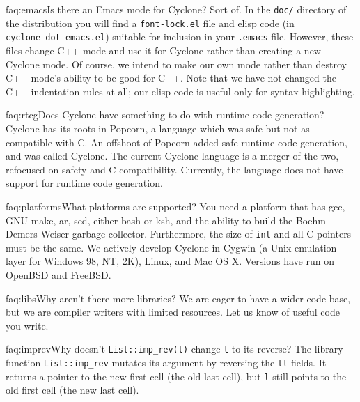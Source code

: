 \begin{faqa}{faq:emacs}{Is there an Emacs mode for Cyclone?}
Sort of.  In the \texttt{doc/} directory of the distribution you will
find a \texttt{font-lock.el} file and elisp code (in
\texttt{cyclone_dot_emacs.el}) suitable for inclusion in your
\texttt{.emacs} file.  However, these files change C++ mode and use it
for Cyclone rather than creating a new Cyclone mode.  Of course, we
intend to make our own mode rather than destroy C++-mode's ability to
be good for C++.  Note that we have not changed the C++ indentation
rules at all; our elisp code is useful only for syntax highlighting.
\end{faqa}

\begin{faqa}{faq:rtcg}{Does Cyclone have something to do with runtime code generation?}
Cyclone has its roots in Popcorn, a language which was safe but not as
compatible with C\@.  An offshoot of Popcorn added safe runtime code
generation, and was called Cyclone.  The current Cyclone language is a
merger of the two, refocused on safety and C compatibility.
Currently, the language does not have support for runtime code
generation.
\end{faqa}

\begin{faqa}{faq:platforms}{What platforms are supported?}
You need a platform that has gcc, GNU make, ar, sed, either bash or
ksh, and the ability to build the Boehm-Demers-Weiser garbage
collector.  Furthermore, the size of \texttt{int} and all C pointers
must be the same.  We actively develop Cyclone in Cygwin (a Unix
emulation layer for Windows 98, NT, 2K), Linux, and Mac OS X.
Versions have run on OpenBSD and FreeBSD.
\end{faqa}

\begin{faqa}{faq:libs}{Why aren't there more libraries?}
We are eager to have a wider code base, but we are compiler writers
with limited resources.  Let us know of useful code you write.
\end{faqa}

\begin{faqa}{faq:imprev}{Why doesn't \texttt{List::imp_rev(l)} change \texttt{l} to its reverse?} 
The library function \texttt{List::imp_rev} mutates its argument by
reversing the \texttt{tl} fields.  It returns a pointer to the new
first cell (the old last cell), but \texttt{l} still points to the old
first cell (the new last cell).
\end{faqa}

